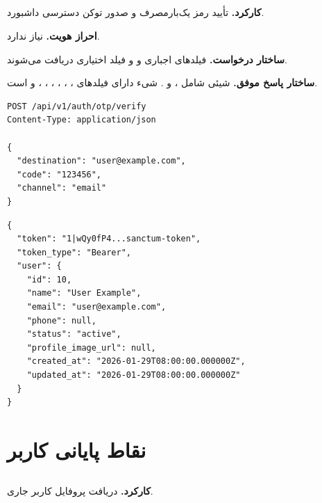 
\subsection{}
\textbf{کارکرد.} تأیید رمز یک‌بارمصرف و صدور توکن دسترسی داشبورد.

\textbf{احراز هویت.} نیاز ندارد.

\textbf{ساختار درخواست.} فیلدهای اجباری  و 
و فیلد اختیاری  دریافت می‌شوند.

\textbf{ساختار پاسخ موفق.} شیئی شامل ، 
و . شیء  دارای فیلدهای ، ،
، ، ، ،
 و  است.

\begin{latin}
\begin{lstlisting}[style=jsonStyle]
POST /api/v1/auth/otp/verify
Content-Type: application/json

{
  "destination": "user@example.com",
  "code": "123456",
  "channel": "email"
}
\end{lstlisting}
\end{latin}


\begin{latin}
\begin{lstlisting}[style=jsonStyle]
{
  "token": "1|wQy0fP4...sanctum-token",
  "token_type": "Bearer",
  "user": {
    "id": 10,
    "name": "User Example",
    "email": "user@example.com",
    "phone": null,
    "status": "active",
    "profile_image_url": null,
    "created_at": "2026-01-29T08:00:00.000000Z",
    "updated_at": "2026-01-29T08:00:00.000000Z"
  }
}
\end{lstlisting}
\end{latin}


\section{نقاط پایانی کاربر}

\subsection{}
\textbf{کارکرد.} دریافت پروفایل کاربر جاری.

